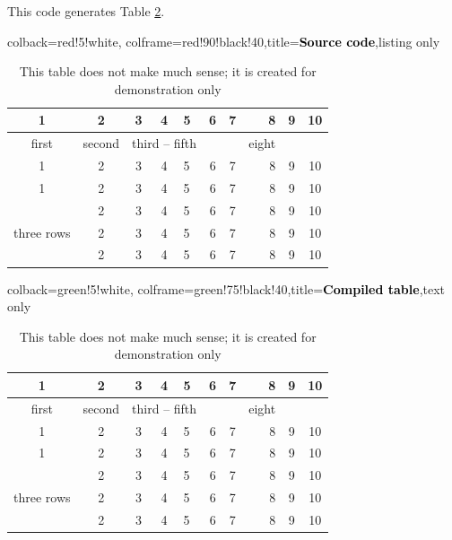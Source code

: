 \documentclass[a4paper,11pt]{article}
\begin{document}
This code generates Table \ref{tab:mytab}.

\bigskip

\begin{tcblisting}{colback=red!5!white, colframe=red!90!black!40,title=\textbf{\textcolor{black}{Source code}},listing only}
\begin{table}[h!]
	\begin{center}
		\caption[Meaningless table]{This table does not make much sense; it is created for demonstration only}\label{tab:mytab}
		\begin{tabular}{|c|c|c|c||l|c|c|r|c|c|}
			\hline
			1 & 2 & 3 & 4 & 5 & 6 & 7 & 8 & 9 & 10 \\ \hline
			first & second & \multicolumn{3}{|c|}{third -- fifth} &   &  & eight &   &  \\ 
			\cline{1-7} \cline{9-10}
			1 & 2 & 3 & 4 & 5 & 6 & 7 & 8 & 9 & 10 \\ \hline
			1 & 2 & 3 & 4 & 5 & 6 & 7 & 8 & 9 & 10 \\ \hline
			\multirow{3}{*}{three rows}  & 2 & 3 & 4 & 5 & 6 & 7 & 8 & 9 & 10 \\ \cline{2-10}
			& 2 & 3 & 4 & 5 & 6 & 7 & 8 & 9 & 10 \\
			& 2 & 3 & 4 & 5 & 6 & 7 & 8 & 9 & 10 \\ \hline
		\end{tabular}
	\end{center}
\end{table}
\end{tcblisting}

\begin{tcblisting}{colback=green!5!white, colframe=green!75!black!40,title=\textbf{\textcolor{black}{Compiled table}},text only}
	\begin{table}[H] %
		\begin{center}
			\caption[Meaningless table]{This table does not make much sense; it is created for demonstration only}\label{tab:mytab}
			\begin{tabular}{|c|c|c|c||l|c|c|r|c|c|}
				\hline
				1 & 2 & 3 & 4 & 5 & 6 & 7 & 8 & 9 & 10 \\ \hline
				first & second & \multicolumn{3}{|c|}{third -- fifth} &   &  & eight &   &  \\ 
				\cline{1-7} \cline{9-10}%
				1 & 2 & 3 & 4 & 5 & 6 & 7 & 8 & 9 & 10 \\ \hline
				1 & 2 & 3 & 4 & 5 & 6 & 7 & 8 & 9 & 10 \\ \hline
				\multirow{3}{*}{three rows}  & 2 & 3 & 4 & 5 & 6 & 7 & 8 & 9 & 10 \\ \cline{2-10}
				& 2 & 3 & 4 & 5 & 6 & 7 & 8 & 9 & 10 \\ %
				& 2 & 3 & 4 & 5 & 6 & 7 & 8 & 9 & 10 \\ \hline
			\end{tabular}
		\end{center}
	\end{table}
\end{tcblisting}
\end{document}
